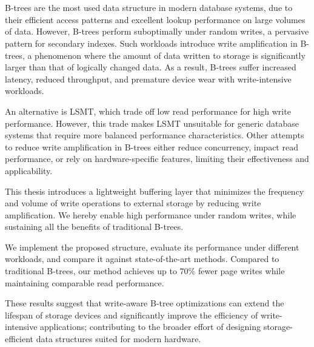 \chapter{\abstractname}

B-trees are the most used data structure in modern database systems, due to their efficient access patterns and excellent lookup performance on large volumes of data.
However, B-trees perform suboptimally under random writes, a pervasive pattern for secondary indexes.
Such workloads introduce write amplification in B-trees, a phenomenon where the amount of data written to storage is significantly larger than that of logically changed data.
As a result, B-trees suffer increased latency, reduced throughput, and premature device wear with write-intensive workloads.

An alternative is \ac{LSMT}, which trade off low read performance for high write performance.
However, this trade makes \ac{LSMT} unsuitable for generic database systems that require more balanced performance characteristics.
Other attempts to reduce write amplification in B-trees either reduce concurrency, impact read performance, or rely on hardware-specific features, limiting their effectiveness and applicability.

This thesis introduces a lightweight buffering layer that minimizes the frequency and volume of write operations to external storage by reducing write amplification.
We hereby enable high performance under random writes, while sustaining all the benefits of traditional B-trees.

We implement the proposed structure, evaluate its performance under different workloads, and compare it against state-of-the-art methods.
Compared to traditional B-trees, our method achieves up to 70\% fewer page writes while maintaining comparable read performance.

These results suggest that write-aware B-tree optimizations can extend the lifespan of storage devices and significantly improve the efficiency of write-intensive applications; contributing to the broader effort of designing storage-efficient data structures suited for modern hardware.